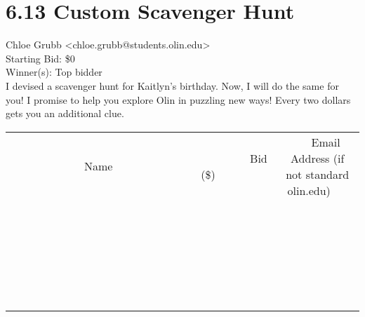 \documentclass[11pt]{article}
\begin{document}
					\section*{6.13 Custom Scavenger Hunt}
					Chloe Grubb <chloe.grubb@students.olin.edu> \\
					Starting Bid: \$0 \\
					Winner(s): Top bidder \\
					I devised a scavenger hunt for Kaitlyn's birthday. Now, I will do the same for you! I promise to help you explore Olin in puzzling new ways! Every two dollars gets you an additional clue. \\
					[6ex]
					\begin{tabular}{c c c}
						~~~~~~~~~~~~~Name~~~~~~~~~~~~~ & ~~~~~~~~~Bid (\$)~~~~~~~~~ & ~~~Email Address (if not standard olin.edu)~~~ \\
				
 & & \\
\hline
 & & \\
\hline
 & & \\
\hline
 & & \\
\hline
 & & \\
\hline
 & & \\
\hline
 & & \\
\hline
 & & \\
\hline
 & & \\
\hline
 & & \\
\hline
 & & \\
\hline
 & & \\
\hline
 & & \\
\hline
 & & \\
\hline
 & & \\
\hline
 & & \\
\hline
 & & \\
\hline
 & & \\
\hline
 & & \\
\hline
 & & \\
\hline
 & & \\
\hline
 & & \\
\hline
 & & \\
\hline
 & & \\
\hline
 & & \\
\hline
 & & \\
\hline
					\end{tabular}
					\clearpage
				
\end{document}
